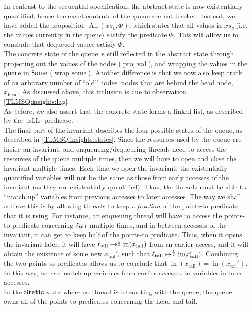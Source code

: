 \documentclass[a4paper, 10pt]{report}
\theoremstyle{definition}
\newcommand{\isLL}{\operatorname{isLL}}
\newcommand{\AllP}{\operatorname{All}}
\newcommand{\projval}{\operatorname{proj\_val}}
\newcommand{\wrapsome}{\operatorname{wrap\_some}}
\newcommand{\locN}[1]{\loc_{\mathrm{#1}}}
\newcommand{\loctail}{\locN{tail}}
\newcommand{\nIn}[1]{\operatorname{in}(#1)}
\newcommand{\node}{x}
\newcommand{\nodeN}[1]{\node_{\mathrm{#1}}}
\newcommand{\nodehead}{\nodeN{head}}
\newcommand{\nodetail}{\nodeN{tail}}
\newcommand{\absvalueList}{xs_v}
\newcommand{\StaticState}{\textbf{Static}}
\begin{document}
In contrast to the sequential specification, the abstract state is now existentially quantified, hence the exact contents of the queue are not tracked. Instead, we have added the proposition $\AllP(\absvalueList, \Phi)$, which states that all values in $\absvalueList$ (i.e. the values currently in the queue) satisfy the predicate $\Phi$. This will allow us to conclude that dequeued values satisfy $\Phi$.\\
The concrete state of the queue is still reflected in the abstract state through projecting out the values of the nodes ($\projval$), and wrapping the values in the queue in $\operatorname{Some}$ ($\wrapsome$). Another difference is that we now also keep track of an arbitrary number of ``old'' nodes; nodes that are behind the head node, $\nodehead$. As discussed above, this inclusion is due to observation \ref{TLMSQ:insights:lag}.\\
As before, we also assert that the concrete state forms a linked list, as described by the $\isLL$ predicate.\\
The final part of the invariant describes the four possible states of the queue, as described in \ref{TLMSQ:insights:states}. Since the resources used by the queue are inside an invariant, and enqueueing/dequeueing threads need to access the resources of the queue multiple times, then we will have to open and close the invariant multiple times. Each time we open the invariant, the existentially quantified variables will not be the same as those from early accesses of the invariant (as they are existentially quantified). Thus, the threads must be able to ``match up'' variables from previous accesses to later accesses. The way we shall achieve this is by allowing threads to keep a \textit{fraction} of the points-to predicate that it is using. For instance, an enqueuing thread will have to access the points-to predicate concerning $\loctail$ multiple times, and in between accesses of the invariant, it can get to keep half of the points-to predicate. Thus, when it opens the invariant later, it will have $\loctail \mapsto^{\frac{1}{2}} \nIn{\nodetail}$ from an earlier access, and it will obtain the existence of some new $\nodetail'$, such that $\loctail \mapsto^{\frac{1}{2}} \nIn{\nodetail'}$. Combining the two points-to predicates allows us to conclude that $\nIn{\nodetail} = \nIn{\nodetail'}$. In this way, we can match up variables from earlier accesses to variables in later accesses.\\
In the \StaticState{} state where no thread is interacting with the queue, the queue owns all of the points-to predicates concerning the head and tail.\\
\end{document}

